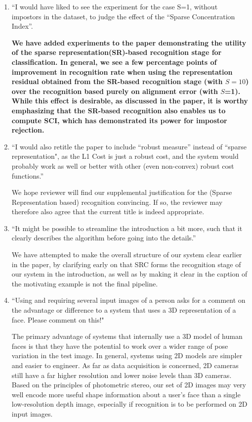 \documentclass[11pt]{article}
\begin{document}
\begin{enumerate}
\item ``I would have liked to see the experiment for the case S=1, without
impostors in the dataset, to judge the effect of the ``Sparse
Concentration Index''.

{\bf We have added experiments to the paper demonstrating
the utility of the sparse representation(SR)-based
recognition stage for classification.  In general, we see a
few percentage points of improvement in recognition rate
when using the representation residual obtained from the
SR-based recognition stage (with $S=10$) over the
recognition based purely on alignment error (with $S$=1).
While this effect is desirable, as discussed in the paper,
it is worthy emphasizing that the SR-based recognition also
enables us to compute SCI, which has demonstrated its power
for impostor rejection.}

\item ``I would also retitle the paper to include ``robust measure''
instead of ``sparse representation", as the L1 Cost is just a robust
cost, and the system would probably work as well or better with other
(even non-convex) robust cost functions.''

We hope reviewer will find our supplemental justification for the (Sparse
Representation based) recognition convincing.  If so, the reviewer may
therefore also agree that the current title is indeed appropriate.

\item ``It might be possible to streamline the introduction a bit more, such that it
clearly describes the algorithm before going into the details.''

We have attempted to make the overall structure of our system clear earlier in the
paper, by clarifying early on that SRC forms the recognition stage of our system
in the introduction, as well as by making it clear in the caption of the motivating example
is not the final pipeline.

\item ``Using and requiring several input images of a person asks for a
comment on the advantage or difference to a system that uses
a 3D representation of a face. Please comment on this!"

The primary advantage of systems that internally use a 3D model of human faces
is that they have the potential to work over a wider range of pose variation in
the test image.  In general, systems using 2D models are simpler and easier to
engineer.  As far as data acquisition is concerned, 2D cameras still have a far
higher resolution and lower noise levels than 3D cameras.  Based on the principles
of photometric stereo, our set of 2D images may very well encode more useful shape
information about a user's face than a single low-resolution depth image, especially if
recognition is to be performed on 2D input images.


\end{enumerate}
\end{document}
